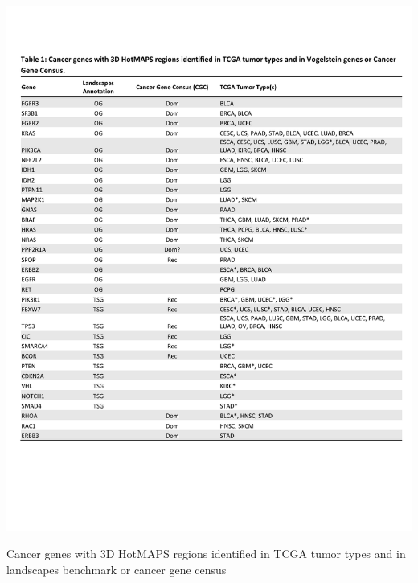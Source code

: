 \begin{table}
  \centering
  \makeatletter
  \let\@currsize\normalsize
  \includegraphics[width=\linewidth]{tables/chapter5/HotMAPS_main_table.pdf}
  \caption[3D HotMAPS regions in known cancer genes]{Cancer genes with 3D HotMAPS regions identified in TCGA tumor types and in landscapes benchmark or cancer gene census}
  \label{tab:hotmaps_main}
\end{table}

